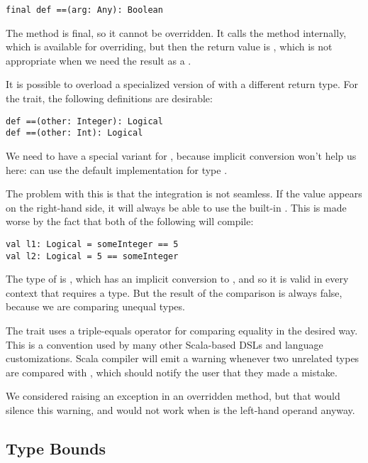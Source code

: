 \begin{lstlisting}[style=snippet]
final def ==(arg: Any): Boolean
\end{lstlisting}
\noindent
The method is final, so it cannot be overridden. It calls the  method
internally, which is available for overriding, but then the return value is
, which is not appropriate when we need the result as a .

It is possible to overload a specialized version of \dop{==} with a different return
type. For the  trait, the following definitions are desirable:

\begin{lstlisting}[style=snippet]
def ==(other: Integer): Logical
def ==(other: Int): Logical
\end{lstlisting}
\noindent
We need to have a special variant for , because implicit conversion won't help
us here:  can use the default implementation for type .

The problem with this is that the integration is not seamless. If the  value
appears on the right-hand side, it will always be able to use the built-in \dop{==}.
This is made worse by the fact that both of the following will compile:

\begin{lstlisting}[style=snippet]
val l1: Logical = someInteger == 5
val l2: Logical = 5 == someInteger
\end{lstlisting}
\noindent
The type of  is , which has an implicit conversion to
, and so it is valid in every context that requires a  type. But
the result of the comparison is always false, because we are comparing unequal types.

\medskip

The  trait uses a triple-equals \dop{===} operator for comparing equality in
the desired way. This is a convention used by many other Scala-based DSLs and language
customizations. Scala compiler will emit a warning whenever two unrelated types are
compared with \dop{==}, which should notify the user that they made a mistake.

We considered raising an exception in an overridden  method, but that would
silence this warning, and would not work when  is the left-hand operand anyway.


\subsection{Type Bounds}

